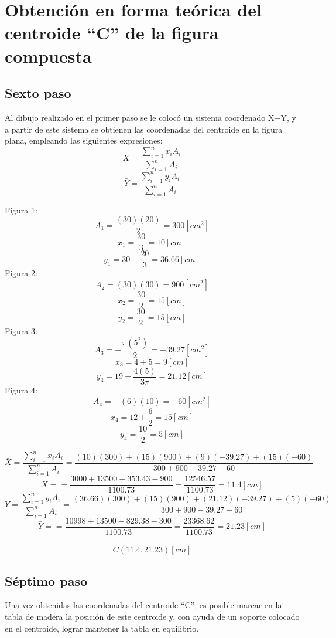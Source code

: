 \documentclass[12pt, titlepage]{report}
\begin{document}
    \hfill
    \section{Obtención en forma teórica del centroide ``C'' de la figura compuesta}
    \subsection*{Sexto paso}
    Al dibujo realizado en el primer paso se le colocó un sistema coordenado X$-$Y, y a partir de este sistema se obtienen las coordenadas del centroide en la figura plana, empleando las siguientes expresiones:
    $$ \bar{X}=\frac{\sum_{i= 1}^{n} x_{i}A_{i}}{\sum_{i= 1}^{n}A_{i}}$$
    $$ \bar{Y}=\frac{\sum_{i= 1}^{n} y_{i}A_{i}}{\sum_{i= 1}^{n}A_{i}}$$

    Figura 1:
    $$A_{1}=\frac{(30)(20)}{2}=300 [cm^2]$$
    $$x_{1}=\frac{30}{3}=10[cm]$$
    $$y_{1}=30+\frac{20}{3}=36.66[cm]$$
    Figura 2:
    $$A_{2}=(30)(30)=900[cm^2]$$
    $$x_{2}=\frac{30}{2}=15[cm]$$
    $$y_{2}=\frac{30}{2}=15[cm]$$
    Figura 3:
    $$A_{3}=-\frac{\pi(5^2)}{2}=-39.27[cm^2]$$
    $$x_{3}=4+5=9[cm]$$
    $$y_{3}=19+\frac{4(5)}{3\pi}=21.12[cm]$$
    Figura 4:
    $$A_{4}=-(6)(10)=-60[cm^2]$$
    $$x_{4}=12+\frac{6}{2}=15[cm]$$
    $$y_{4}=\frac{10}{2}=5[cm]$$
    
    $$ \bar{X}=\frac{\sum_{i= 1}^{n} x_{i}A_{i}}{\sum_{i= 1}^{n}A_{i}} = \frac{(10)(300)+(15)(900)+(9)(-39.27)+(15)(-60)}{300+900-39.27-60}$$
    $$ \bar{X}==\frac{3000+13500-353.43-900}{1100.73}=\frac{12546.57}{1100.73}=11.4[cm]$$
    $$ \bar{Y}=\frac{\sum_{i= 1}^{n} y_{i}A_{i}}{\sum_{i= 1}^{n}A_{i}} = \frac{(36.66)(300)+(15)(900)+(21.12)(-39.27)+(5)(-60)}{300+900-39.27-60}$$
    $$ \bar{Y}==\frac{10998+13500-829.38-300}{1100.73}=\frac{23368.62}{1100.73}=21.23[cm]$$ \\
    $$C(11.4, 21.23) [cm]$$

    \subsection*{Séptimo paso}
    Una vez obtenidas las coordenadas del centroide ``C'', es posible marcar en la tabla de madera la posición de este centroide y, con ayuda de un soporte colocado en el centroide, lograr mantener la tabla en equilibrio.
\end{document}
